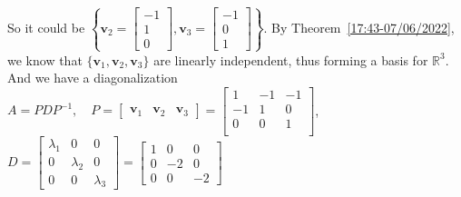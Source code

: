 \documentclass{beamer}
\theoremstyle{definition}
\theoremstyle{remark}
\begin{document}
\begin{frame}[t]
\begin{solution}
So it could be $\left\{\mathbf v_2=\begin{bmatrix}
-1\\1\\0
\end{bmatrix},\mathbf v_3=\begin{bmatrix}
-1\\0\\1
\end{bmatrix}\right\}$. By Theorem~\ref{17:43-07/06/2022}, we know that $\{\mathbf v_1,\mathbf v_2,\mathbf v_3\}$ are linearly independent, thus forming a basis for $\mathbb R^3$. And we have a diagonalization\pause $A=PDP^{-1},\quad P=\begin{bmatrix}
\mathbf v_1&\mathbf v_2&\mathbf v_3
\end{bmatrix}=\begin{bmatrix}
1&-1&-1\\
-1&1&0\\
0&0&1\\
\end{bmatrix}$, $D=\begin{bmatrix}
\lambda_1&0&0\\
0&\lambda_2&0\\
0&0&\lambda_3
\end{bmatrix}=\begin{bmatrix}
1&0&0\\
0&-2&0\\
0&0&-2
\end{bmatrix}$
\end{solution}
\end{frame}
\end{document}
